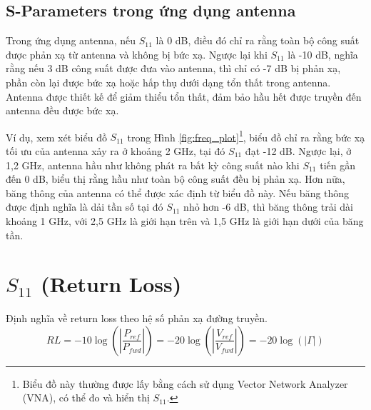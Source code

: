         \subsection{S-Parameters trong ứng dụng antenna}
            Trong ứng dụng antenna, nếu $S_{11}$ là 0 dB, điều đó chỉ ra rằng
            toàn bộ công suất được phản xạ từ antenna và không bị bức xạ.
            Ngược lại khi $S_{11}$ là -10 dB, nghĩa rằng nếu 3 dB công suất được
            đưa vào antenna, thì chỉ có -7 dB bị phản xạ, phần còn lại được bức xạ 
            hoặc hấp thụ dưới dạng tổn thất trong antenna. Antenna được thiết kế
            để giảm thiểu tổn thất, đảm bảo hầu hết được truyền đến antenna đều được bức xạ.\cite{cadence2023sparams}

            Ví dụ, xem xét biểu đồ $S_{11}$ trong Hình \ref{fig:freq_plot}\footnote{Biểu đồ này thường được lấy bằng cách sử dụng Vector Network Analyzer (VNA), 
            có thể đo và hiển thị $S_{11}$.}, biểu đồ chỉ ra rằng bức xạ tối ưu của antenna xảy ra ở khoảng 2 GHz, tại đó $S_{11}$ đạt -12 dB. 
            Ngược lại, ở 1,2 GHz, antenna hầu như không phát ra bất kỳ công suất nào khi $S_{11}$ tiến gần đến 0 dB, biểu thị rằng hầu như 
            toàn bộ công suất đều bị phản xạ. Hơn nữa, băng thông của antenna có thể được xác định từ biểu đồ này. Nếu băng thông được 
            định nghĩa là dải tần số tại đó $S_{11}$ nhỏ hơn -6 dB, thì băng thông trải dài khoảng 1 GHz, với 2,5 GHz là giới hạn trên và 
            1,5 GHz là giới hạn dưới của băng tần.

    

    \section{$S_{11}$ (Return Loss)}
        Định nghĩa về return loss theo hệ số phản xạ đường truyền.
        $$RL = -10\log\left(\left|\frac{P_{ref}}{P_{fwd}}\right|\right) = -20\log\left(\left|\frac{V_{ref}}{V_{fwd}}\right|\right) = -20\log\left(\left|\Gamma\right|\right)$$

